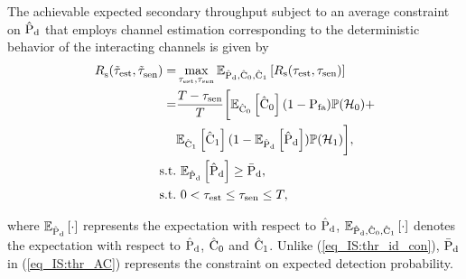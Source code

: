 \begin{theorem} \label{th_IS:th1}
\normalfont
The achievable expected secondary throughput subject to an average constraint on $\epd$ that employs channel estimation corresponding to the deterministic behavior of the interacting channels is given by  
\begin{align}
\trsac(\ttest, \ttsenac) =& \maxi_{\tc{\test}, \tsen} \e{\epd, \ecz, \eco}{\rs(\test, \tsen)} \nonumber \\ 
\quad =& \frac{T- \tsen}{T} \bigg[ \e{\ecz}{\ecz} (1 - \pfa) \phz + \nonumber \\ \quad & \e{\eco}{\eco} (1 - \e{\epd}{\epd}) \pho  \bigg], \label{eq_IS:thr_AC} \\
\text{s.t.} & \text{ }  \e{\epd}{\epd} \ge \pdd, \label{eq_IS:AC} \\
\tc{\text{s.t.}} & \text{ }  \tc{0 < \test \le \tsen \le T,} \nonumber
\end{align}
\end{theorem} 
where $\e{\epd}{\cdot}$ represents the expectation with respect to $\epd$, $\e{\epd, \ecz, \eco}{\cdot}$ denotes the expectation with respect to $\epd$, $\ecz$ and $\eco$. Unlike (\ref{eq_IS:thr_id_con}), $\pdd$ in (\ref{eq_IS:thr_AC}) represents the constraint on expected detection probability.

\begin{IEEEproof}[Solution]
\end{IEEEproof}

